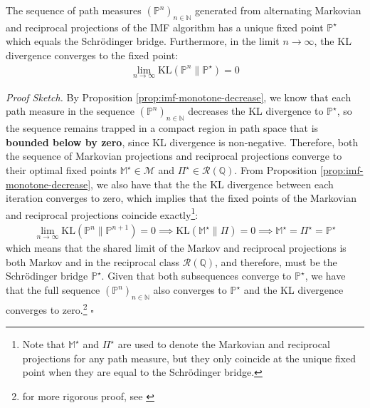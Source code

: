 \documentclass{article}
\begin{document}
\begin{proposition}\label{thm:imf-convergence}
    The sequence of path measures $(\mathbb{P}^n)_{n\in \mathbb{N}}$ generated from alternating Markovian and reciprocal projections of the IMF algorithm has a unique fixed point $\mathbb{P}^\star$ which equals the Schrödinger bridge. Furthermore, in the limit $n\to \infty$, the KL divergence converges to the fixed point:
    \begin{align}
        \lim_{n \to \infty}\text{KL}(\mathbb{P}^n\|\mathbb{P}^\star) =  0
    \end{align}
\end{proposition}

\textit{Proof Sketch.} By Proposition \ref{prop:imf-monotone-decrease}, we know that each path measure in the sequence $(\mathbb{P}^{n})_{n \in \mathbb{N}}$ decreases the KL divergence to $\mathbb{P}^\star$, so the sequence remains trapped in a compact region in path space that is \textbf{bounded below by zero}, since KL divergence is non-negative. Therefore, both the sequence of Markovian projections and reciprocal projections converge to their optimal fixed points $\mathbb{M}^\star\in \mathcal{M}$ and $\Pi^\star\in \mathcal{R}(\mathbb{Q})$. From Proposition \ref{prop:imf-monotone-decrease}, we also have that the the KL divergence between each iteration converges to zero, which implies that the fixed points of the Markovian and reciprocal projections coincide exactly\footnote{Note that $\mathbb{M}^\star$ and $\Pi^\star$ are used to denote the Markovian and reciprocal projections for any path measure, but they only coincide at the unique fixed point when they are equal to the Schrödinger bridge.}:
\begin{align}
    \lim_{n \to \infty}\text{KL}(\mathbb{P}^{n}\|\mathbb{P}^{n+1})= 0\implies \text{KL}(\mathbb{M}^\star\|\Pi) = 0\implies \boxed{\mathbb{M}^\star=\Pi^\star=\mathbb{P}^\star}
\end{align}
which means that the shared limit of the Markov and reciprocal projections is both Markov and in the reciprocal class $\mathcal{R}(\mathbb{Q})$, and therefore, must be the Schrödinger bridge $\mathbb{P}^\star$. Given that both subsequences converge to $\mathbb{P}^\star$, we have that the full sequence $(\mathbb{P}^{n})_{n \in \mathbb{N}}$ also converges to $\mathbb{P}^\star$ and the KL divergence converges to zero.\footnote{for more rigorous proof, see \citep{shi2023diffusion}} \hfill $\square$ 
\end{document}
